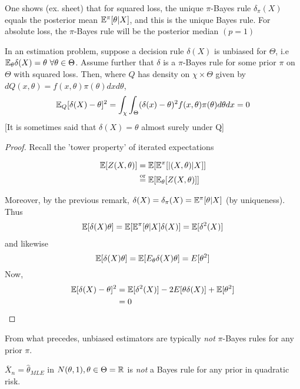 \documentclass[a4paper]{article}
\begin{document}
\begin{remark}
	One shows (ex. sheet) that for squared loss, the unique $\pi$-Bayes rule $\delta_{\pi}(X)$ equals the posterior mean $\mathbb{E}^{\pi}[\theta | X]$, and this is the unique Bayes rule. For absolute loss, the $\pi$-Bayes rule will be the posterior median $(p=1)$
\end{remark}

\begin{prop}
	In an estimation problem, suppose a decision rule $\delta(X)$ is unbiased for $\Theta$, i.e $\mathbb{E}_{\theta} \delta(X) = \theta \text{ } \forall \theta \in \Theta$. Assume further that $\delta$ is a $\pi$-Bayes rule for some prior $\pi$ on $\Theta$ with squared loss. Then, where $Q$ has density on $\chi \times \Theta$ given by $dQ(x, \theta) = f(x, \theta) \pi(\theta) dx d\theta$,
	\begin{align*}
		\mathbb{E}_Q [\delta(X) - \theta]^2 = \int_{\chi} \int_{\Theta} (\delta(x) - \theta)^2 f(x, \theta) \pi(\theta) d\theta dx = 0
	\end{align*}
	[It is sometimes said that $\delta(X) =  \theta$ almost surely under Q]
\end{prop}

\begin{proof}
	Recall the 'tower property' of iterated expectations

	\begin{align*}
		\mathbb{E}[Z(X,\theta)] &= \mathbb{E} [\mathbb{E}^{\pi} [|(X,\theta)|X]] \\
				&\overset{\text{or}}{=} \mathbb{E} [\mathbb{E}_{\theta} [Z(X,\theta)]]
	\end{align*}
	
	Moreover, by the previous remark, $\delta(X) = \delta_{\pi}(X) = \mathbb{E}^{\pi}[\theta|X]$ (by uniqueness). Thus
	\begin{align*}
		\mathbb{E} [\delta(X) \theta] = \mathbb{E} [ \mathbb{E}^{\pi} [\theta |X] \delta(X) ] = \mathbb{E} [\delta ^2 (X)]
	\end{align*}
	and likewise
	\[
		\mathbb{E} [\delta(X) \theta] = \mathbb{E} [ E_{\theta} \delta (X) \theta ] = E[\theta ^2]
	\] 
	Now, 
	\begin{align*}
	\mathbb{E}[\delta(X) - \theta]^2 &= \mathbb{E}[\delta^2(X)] - 2 E[\theta \delta(X)] + \mathbb{E}[\theta ^2] \\
				 &= 0
	\end{align*}
\end{proof}

From what precedes, unbiased estimators are typically \textit{not} $\pi$-Bayes rules for any prior $\pi$.

\begin{eg}
	$\overline{X}_n = \hat{\theta}_{MLE}$ in $N(\theta, 1), \theta \in \Theta = \mathbb{R}$ is \textit{not} a Bayes rule for any prior in quadratic risk.
\end{eg}
\end{document}
